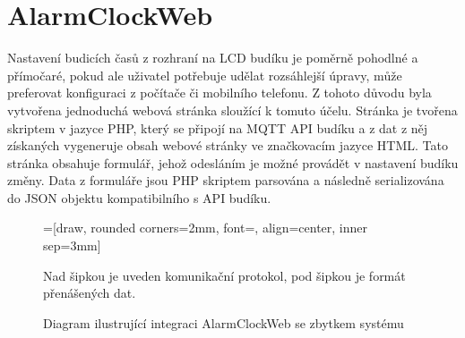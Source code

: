 \section{AlarmClockWeb}
Nastavení budicích časů z rozhraní na LCD budíku je poměrně pohodlné
a přímočaré, pokud ale uživatel potřebuje udělat rozsáhlejší úpravy, může
preferovat konfiguraci z počítače či mobilního telefonu.
Z tohoto důvodu byla vytvořena jednoduchá webová stránka sloužící k tomuto
účelu. Stránka je tvořena skriptem v jazyce PHP, který se připojí na MQTT API
budíku a z dat z něj získaných vygeneruje obsah webové stránky ve značkovacím
jazyce HTML. Tato stránka obsahuje formulář, jehož odesláním je možné provádět
v nastavení budíku změny. Data z formuláře jsou PHP skriptem parsována
a následně serializována do JSON objektu kompatibilního s API budíku.


\begin{figure}[htbp]
    \centering
    =[draw, rounded corners=2mm, font={\bfseries}, align=center, inner sep=3mm]

    {\footnotesize Nad šipkou je uveden komunikační protokol, pod šipkou je
    formát přenášených dat.}
    \caption{Diagram ilustrující integraci AlarmClockWeb se zbytkem systému}
    \label{fig:web blok}
\end{figure}


